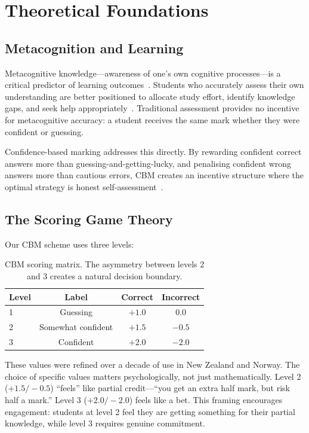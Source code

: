 \documentclass[sigconf]{acmart}
\begin{document}
\section{Theoretical Foundations}

\subsection{Metacognition and Learning}

Metacognitive knowledge---awareness of one's own cognitive processes---is a critical predictor of learning outcomes~\cite{flavell1976metacognitive}. Students who accurately assess their own understanding are better positioned to allocate study effort, identify knowledge gaps, and seek help appropriately~\cite{dunlosky2011four}. Traditional assessment provides no incentive for metacognitive accuracy: a student receives the same mark whether they were confident or guessing.

Confidence-based marking addresses this directly. By rewarding confident correct answers more than guessing-and-getting-lucky, and penalising confident wrong answers more than cautious errors, CBM creates an incentive structure where the optimal strategy is honest self-assessment~\cite{gardner2006confidence}.

\subsection{The Scoring Game Theory}

Our CBM scheme uses three levels:

\begin{table}[h]
\centering
\caption{CBM scoring matrix. The asymmetry between levels 2 and 3 creates a natural decision boundary.}
\label{tab:cbm_scoring}
\begin{tabular}{lccc}
\toprule
\textbf{Level} & \textbf{Label} & \textbf{Correct} & \textbf{Incorrect} \\
\midrule
1 & Guessing & $+1.0$ & $0.0$ \\
2 & Somewhat confident & $+1.5$ & $-0.5$ \\
3 & Confident & $+2.0$ & $-2.0$ \\
\bottomrule
\end{tabular}
\end{table}

These values were refined over a decade of use in New Zealand and Norway. The choice of specific values matters psychologically, not just mathematically. Level 2 ($+1.5/-0.5$) ``feels'' like partial credit---``you get an extra half mark, but risk half a mark.'' Level 3 ($+2.0/-2.0$) feels like a bet. This framing encourages engagement: students at level 2 feel they are getting something for their partial knowledge, while level 3 requires genuine commitment.
\end{document}
